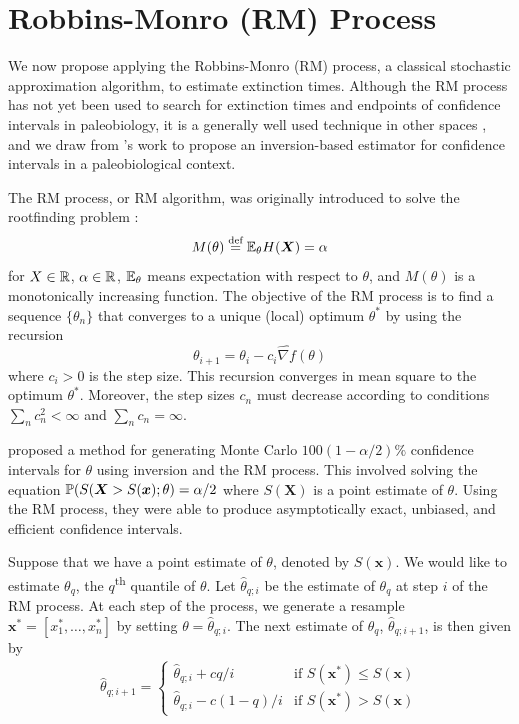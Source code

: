 \section{Robbins-Monro (RM) Process}

We now propose applying the Robbins-Monro (RM) process, a classical stochastic approximation algorithm, to estimate extinction times. Although the RM process has not yet been used to search for extinction times and endpoints of confidence intervals in paleobiology, it is a generally well used technique in other spaces \parencite{Carpenter1999, Fisher2020}, and we draw from \textcite{Garthwaite1992}'s work to propose an inversion-based estimator for confidence intervals in a paleobiological context.

The RM process, or RM algorithm, was originally introduced to solve the rootfinding problem  \parencite{Fu2015}: \[ M(\theta)\overset{\text{def}}{=} \mathbb{E}_\theta H(\bm{X}) = \alpha \] for $X \in \mathbb{R}$, $\alpha \in \mathbb{R}$, $\mathbb{E}_\theta$ means expectation with respect to $\theta$, and $M(\theta)$ is a monotonically increasing function. The objective of the RM process is to find a sequence $\{\theta_n\}$ that converges to a unique (local) optimum $\theta^*$ by using the recursion \[ \theta_{i+1} = \theta_i - c_i \widehat{\nabla f}(\theta) \] where $c_i > 0$ is the step size. This recursion converges in mean square to the optimum $\theta^*$. Moreover, the step sizes $c_n$ must decrease according to conditions $\sum_nc_n^2 < \infty$ and $\sum_n c_n = \infty$.

\textcite{Garthwaite1992} proposed a method for generating Monte Carlo $100(1-\alpha/2)\%$ confidence intervals for $\theta$ using inversion and the RM process. This involved solving the equation $\mathbb{P}(S(\bm{X} > S(\bm{x}); \theta) = \alpha/2$ where $S(\bm{X})$ is a point estimate of $\theta$. Using the RM process, they were able to produce asymptotically exact, unbiased, and efficient confidence intervals.

Suppose that we have a point estimate of $\theta$, denoted by $S(\bm{x})$. We would like to estimate $\theta_{q}$, the $q$\textsuperscript{th} quantile of $\theta$. Let $\hat\theta_{q; i}$ be the estimate of $\theta_q$ at step $i$ of the RM process. At each step of the process, we generate a resample $\bm{x}^* = [x_1^*, \dots, x_n^*]$ by setting $\theta = \hat\theta_{q; i}$. The next estimate of $\theta_q$, $\hat\theta_{q; i+1}$, is then given by \begin{align}
    \hat\theta_{q; i+1} = \begin{cases}
        \hat\theta_{q; i} + c q/i &\text{if $S(\bm{x^*}) \leq S(\bm{x})$} \\
        \hat\theta_{q; i} - c (1-q)/i &\text{if $S(\bm{x^*}) > S(\bm{x})$}
    \end{cases}
\end{align}

